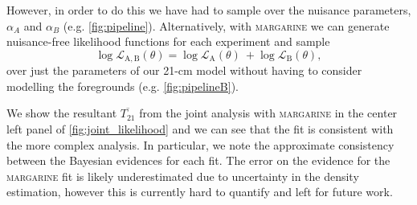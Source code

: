 However, in order to do this we have had to sample over the nuisance parameters, $\alpha_A$ and $\alpha_B$ (e.g. \cref{fig:pipeline}). Alternatively, with \textsc{margarine} we can generate nuisance-free likelihood functions for each experiment and sample
\begin{equation}
    \log \mathcal{L}_\mathrm{A,B} (\theta) = \log \mathcal{L}_\mathrm{A} (\theta)~+ \log \mathcal{L}_\mathrm{B} (\theta),
\end{equation}
over just the parameters of our 21-cm model without having to consider modelling the foregrounds (e.g. \cref{fig:pipelineB}).

We show the resultant $\overline{T_{21}}$ from the joint analysis with \textsc{margarine} in the center left panel of \cref{fig:joint_likelihood} and we can see that the fit is consistent with the more complex analysis. In particular, we note the approximate consistency between the Bayesian evidences for each fit. The error on the evidence for the \textsc{margarine} fit is likely underestimated due to uncertainty in the density estimation, however this is currently hard to quantify and left for future work.

